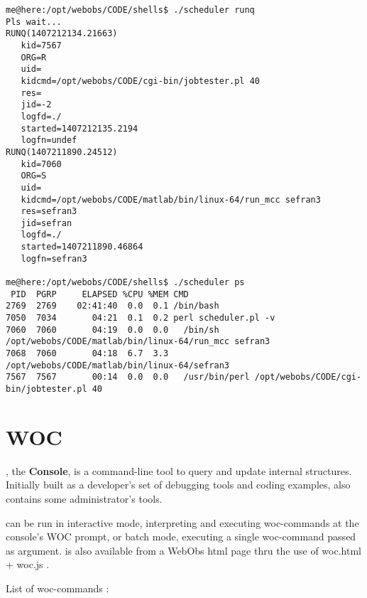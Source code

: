\begin{lstlisting}[style=console,title=example runq and ps]
me@here:/opt/webobs/CODE/shells$ ./scheduler runq
Pls wait...
RUNQ(1407212134.21663)
   kid=7567
   ORG=R
   uid=
   kidcmd=/opt/webobs/CODE/cgi-bin/jobtester.pl 40 
   res=
   jid=-2
   logfd=./
   started=1407212135.2194
   logfn=undef
RUNQ(1407211890.24512)
   kid=7060
   ORG=S
   uid=
   kidcmd=/opt/webobs/CODE/matlab/bin/linux-64/run_mcc sefran3 
   res=sefran3
   jid=sefran
   logfd=./
   started=1407211890.46864
   logfn=sefran3

me@here:/opt/webobs/CODE/shells$ ./scheduler ps
 PID  PGRP     ELAPSED %CPU %MEM CMD
2769  2769    02:41:40  0.0  0.1 /bin/bash
7050  7034       04:21  0.1  0.2 perl scheduler.pl -v
7060  7060       04:19  0.0  0.0   /bin/sh /opt/webobs/CODE/matlab/bin/linux-64/run_mcc sefran3
7068  7060       04:18  6.7  3.3     /opt/webobs/CODE/matlab/bin/linux-64/sefran3
7567  7567       00:14  0.0  0.0   /usr/bin/perl /opt/webobs/CODE/cgi-bin/jobtester.pl 40
\end{lstlisting}

\section{WOC}

, the \webobs \textbf{Console}, is a command-line tool to query and update internal \webobs structures.
Initially built as a developer's set of debugging tools and coding examples,  also contains some \webobs administrator's tools. 

 can be run in interactive mode, interpreting and executing woc-commands at the console's WOC prompt, or 
batch mode, executing a single woc-command passed as argument.  is also available from a WebObs html page 
thru the use of woc.html + woc.js .

List of woc-commands :

